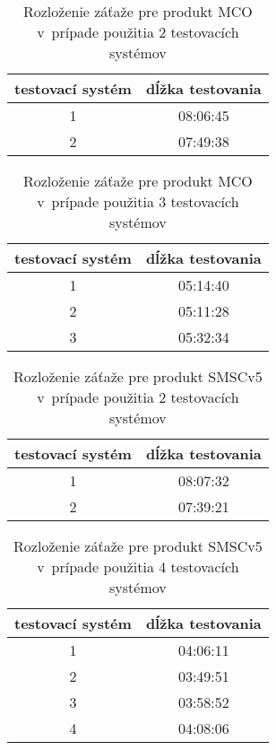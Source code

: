 \begin{table}[h!]
  \begin{center}
    \begin{tabular}{ | c | c | }
      \hline
      testovací systém & dĺžka testovania \\ \hline
      1  & 08:06:45  \\ \hline
      2  & 07:49:38  \\ \hline 
    \end{tabular}
    \caption{Rozloženie záťaže pre produkt MCO v~prípade použitia 2 
             testovacích systémov}
    \label{tabulka:rozlozenie_zataze_mco_2}
  \end{center}
\end{table}

\begin{table}[h!]
  \begin{center}
    \begin{tabular}{ | c | c | }
      \hline
      testovací systém & dĺžka testovania \\ \hline
      1  & 05:14:40  \\ \hline
      2  & 05:11:28  \\ \hline 
      3  & 05:32:34  \\ \hline 
    \end{tabular}
    \caption{Rozloženie záťaže pre produkt MCO v~prípade použitia 3 
             testovacích systémov}
    \label{tabulka:rozlozenie_zataze_mco_3}
  \end{center}
\end{table}


\begin{table}[h!]
  \begin{center}
    \begin{tabular}{ | c | c | }
      \hline
      testovací systém & dĺžka testovania \\ \hline
      1  & 08:07:32  \\ \hline
      2  & 07:39:21  \\ \hline 
    \end{tabular}
    \caption{Rozloženie záťaže pre produkt SMSCv5 v~prípade použitia 2 
             testovacích systémov}
    \label{tabulka:rozlozenie_zataze_smsc_2}
  \end{center}
\end{table}

\begin{table}[h!]
  \begin{center}
    \begin{tabular}{ | c | c | }
      \hline
      testovací systém & dĺžka testovania \\ \hline
      1  & 04:06:11  \\ \hline
      2  & 03:49:51  \\ \hline 
      3  & 03:58:52  \\ \hline 
      4  & 04:08:06  \\ \hline
    \end{tabular}
    \caption{Rozloženie záťaže pre produkt SMSCv5 v~prípade použitia 4 
             testovacích systémov}
    \label{tabulka:rozlozenie_zataze_smsc_4}
  \end{center}
\end{table}



